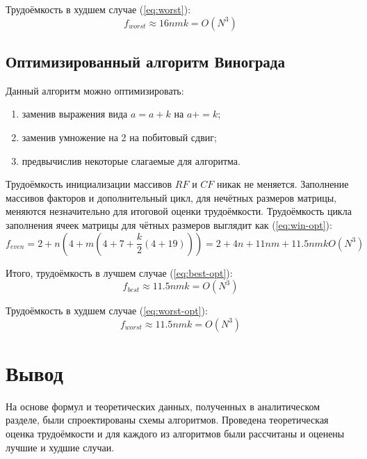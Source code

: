 Трудоёмкость в худшем случае (\ref{eq:worst}):
\begin{equation}
    \label{eq:worst}
    f_{worst} \approx 16nmk = O(N^3)
\end{equation}

\subsection{Оптимизированный алгоритм Винограда}

Данный алгоритм можно оптимизировать:
\begin{enumerate}
	\item заменив выражения вида $a = a + k$ на $a += k$;
	\item заменив умножение на 2 на побитовый сдвиг;
	\item предвычислив некоторые слагаемые для алгоритма.
\end{enumerate}

Трудоёмкость инициализации массивов $RF$ и $CF$ никак не меняется.
Заполнение массивов факторов и дополнительный цикл, для нечётных размеров матрицы, меняются незначительно для итоговой оценки трудоёмкости.
Трудоёмкость цикла заполнения ячеек матрицы для чётных размеров выглядит как (\ref{eq:win-opt}):
\begin{equation}
    \label{eq:win-opt}
    f_{even} = 2 + n(4 + m(4 + 7 + \frac{k}{2}(4 + 19))) = 2 + 4n + 11nm + 11.5nmk O(N^3)
\end{equation}

Итого, трудоёмкость в лучшем случае (\ref{eq:best-opt}):
\begin{equation}
    \label{eq:best-opt}
    f_{best} \approx 11.5nmk = O(N^3)
\end{equation}

Трудоёмкость в худшем случае (\ref{eq:worst-opt}):
\begin{equation}
    \label{eq:worst-opt}
    f_{worst} \approx 11.5nmk = O(N^3)
\end{equation}

\section*{Вывод}

На основе формул и теоретических данных, полученных в аналитическом разделе, были спроектированы схемы алгоритмов.
Проведена теоретическая оценка трудоёмкости и для каждого из алгоритмов были рассчитаны и оценены лучшие и худшие случаи.
